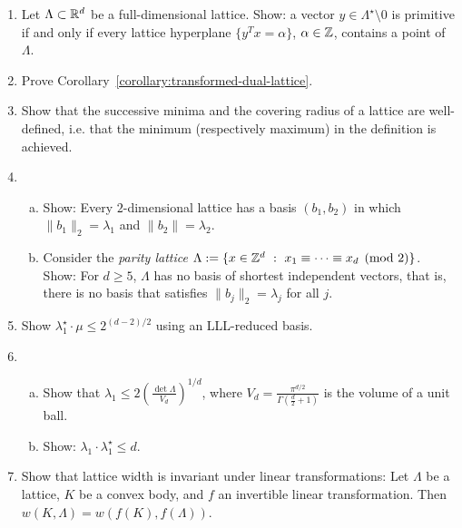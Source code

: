 \begin{enumerate}
  \item
    Let $\Lambda \subset \mathbb{R}^d$ be a full-dimensional lattice.
    Show: a vector $y \in \Lambda^\star \setminus 0$ is primitive
    if and only if
    every lattice hyperplane $\{ y^T x = \alpha\}$, $\alpha \in \mathbb{Z}$, contains a point of $\Lambda$.

  \item Prove Corollary~\ref{corollary:transformed-dual-lattice}.

  \item
    Show that the successive minima and the covering radius of a lattice are well-defined,
    i.e. that the minimum (respectively maximum) in the definition is achieved.

  \item
    \begin{enumerate}[(a)]
    \item Show: Every $2$-dimensional lattice has a basis $(b_1, b_2)$
      in which $\|b_1\|_2 = \lambda_1$ and $\|b_2\| = \lambda_2$.

    \item
      Consider the \emph{parity lattice}
      $\Lambda := \{ x \in \mathbb{Z}^d ~:~ x_1 \equiv \dots \equiv x_d \pmod{2} \}$.
      Show: For $d \geq 5$, $\Lambda$ has no basis of shortest independent vectors,
      that is, there is no basis that satisfies $\|b_j\|_2 = \lambda_j$ for all $j$.
    \end{enumerate}

  \item
    Show $\lambda_1^\star \cdot \mu \leq 2^{(d-2)/2}$ using an LLL-reduced basis.

  \item
    \begin{enumerate}[(a)]
      \item Show that
        $\lambda_1 \leq 2 \left( \frac{\det \Lambda}{V_d} \right)^{1/d}$,
        where $V_d = \frac{\pi^{d/2}}{\Gamma(\frac{d}{2} + 1)}$ is the volume of a unit ball.

      \item Show: $\lambda_1 \cdot \lambda_1^\star \leq d$.
    \end{enumerate}

  \item
    Show that lattice width is invariant under linear transformations:
    Let $\Lambda$ be a lattice, $K$ be a convex body, and $f$ an invertible linear transformation.
    Then $w(K, \Lambda) = w(f(K), f(\Lambda))$.

\end{enumerate}

